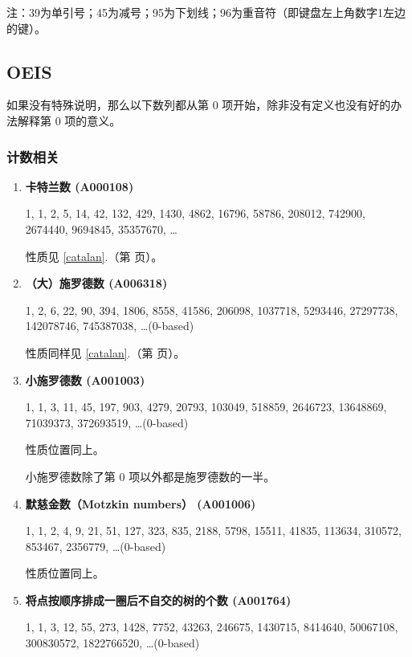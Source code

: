 \documentclass[a4paper, twoside]{article}
\newcommand\detailedref[1]{\ref{#1}.\nameref{#1}（第 \pageref{#1} 页）}
\begin{document}
注：39为单引号；45为减号；95为下划线；96为重音符（即键盘左上角数字1左边的键）。

\newpage
\subsection{OEIS}
\label{OEIS}

如果没有特殊说明，那么以下数列都从第 $0$ 项开始，除非没有定义也没有好的办法解释第 $0$ 项的意义。

    \subsubsection{计数相关}

    \begin{enumerate}

        \item \textbf{卡特兰数 (A000108)}

        1, 1, 2, 5, 14, 42, 132, 429, 1430, 4862, 16796, 58786, 208012, 742900, 2674440, 9694845, 35357670, \dots

        性质见 \detailedref{catalan}。 

        \item \textbf{（大）施罗德数 (A006318)}

        1, 2, 6, 22, 90, 394, 1806, 8558, 41586, 206098, 1037718, 5293446, 27297738, 142078746, 745387038, \dots \;(0-based)

        性质同样见 \detailedref{catalan}。

        \item \textbf{小施罗德数 (A001003)}

        1, 1, 3, 11, 45, 197, 903, 4279, 20793, 103049, 518859, 2646723, 13648869, 71039373, 372693519, \dots \;(0-based)

        性质位置同上。

        小施罗德数除了第 $0$ 项以外都是施罗德数的一半。

        \item \textbf{默慈金数（Motzkin numbers） (A001006)}

        1, 1, 2, 4, 9, 21, 51, 127, 323, 835, 2188, 5798, 15511, 41835, 113634, 310572, 853467, 2356779, \dots \;(0-based)

        性质位置同上。

        \item \textbf{将点按顺序排成一圈后不自交的树的个数 (A001764)}

        1, 1, 3, 12, 55, 273, 1428, 7752, 43263, 246675, 1430715, 8414640, 50067108, 300830572, 1822766520, \dots \;(0-based)


\end{enumerate}
\end{document}
